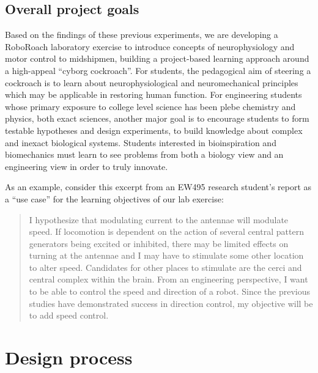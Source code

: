 \documentclass[twocolumn,10pt]{IEEEtran}
\begin{document}
\subsection{Overall project goals}
Based on the findings of these previous experiments, we are developing a RoboRoach laboratory exercise to introduce concepts of neurophysiology and motor control to midshipmen, building a project-based learning approach around a high-appeal ``cyborg cockroach''. For students, the pedagogical aim of steering a cockroach is to learn about neurophysiological and neuromechanical principles which may be applicable in restoring human function. For engineering students whose primary exposure to college level science has been plebe chemistry and physics, both exact sciences, another major goal is to encourage students to form testable hypotheses and design experiments, to build knowledge about complex and inexact biological systems. Students interested in bioinspiration and biomechanics must learn to see problems from both a biology view and an engineering view in order to truly innovate. 

As an example, consider this excerpt from an EW495 research student's report as a ``use case'' for the learning objectives of our lab exercise:
\begin{quote}
I hypothesize that modulating current to the antennae will modulate speed. If locomotion is dependent on the action of several central pattern generators being excited or inhibited, there may be limited effects on turning at the antennae and I may have to stimulate some other location to alter speed. 
Candidates for other places to stimulate are the cerci and central complex within the brain. From an engineering perspective, I want to be able to control the speed and direction of a robot. Since the previous studies have demonstrated success in direction control, my objective will be to add speed control.
\end{quote}

\section{Design process}
\end{document}
